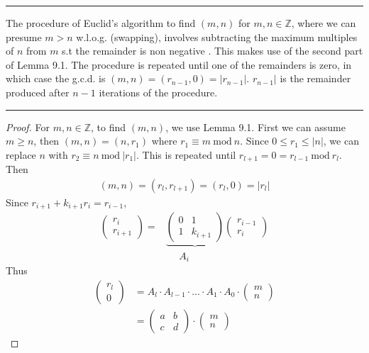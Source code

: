 \documentclass{article}
\theoremstyle{definition}
\theoremstyle{remark}
\begin{document}
\hrule
\vspace{2mm}
The procedure of Euclid's algorithm to find $(m,n)$ for $m,n\in\mathbb{Z}$, where we can presume $m>n$ w.l.o.g. (swapping), involves subtracting the maximum multiples of $n$ from $m$ s.t the remainder is non negative . This makes use of the second part of Lemma 9.1. The procedure is repeated until one of the remainders is zero, in which case the g.c.d. is $(m,n)=(r_{n-1},0)=|r_{n-1}|$. $r_{n-1}|$ is the remainder produced after $n-1$ iterations of the procedure.\\
\hrule
\begin{proof}
	For $m,n\in\mathbb{Z}$, to find $(m,n)$, we use Lemma 9.1. First we can assume $m\geq n$, then $(m,n)=(n,r_1)$ where $r_1\equiv m~\mathrm{mod}~n$. Since $0\leq r_1\leq |n|$, we can replace $n$ with $r_2\equiv n~\mathrm{mod}~|r_1|$. This is repeated until $r_{l+1}=0=r_{l-1}~\mathrm{mod}~r_l$. Then
	\begin{align*}
		(m,n)=(r_l,r_{l+1})=(r_l,0)=|r_l|
	\end{align*}
	Since $r_{i+1}+k_{i+1}r_i=r_{i-1}$,
	\begin{align*}
		\begin{pmatrix}
			r_i \\
			r_{i+1}
		\end{pmatrix}
		=
		 & \underbrace{\begin{pmatrix}
				               0 & 1       \\
				               1 & k_{i+1}
			               \end{pmatrix}}
		\begin{pmatrix}
			r_{i-1} \\
			r_i
		\end{pmatrix}                \\
		 & ~~~~~~A_i
	\end{align*}
	Thus
	\begin{align*}
		\begin{pmatrix}
			r_l \\0
		\end{pmatrix}
		 & =A_l\cdot A_{l-1}\cdot...\cdot A_1\cdot A_0\cdot\begin{pmatrix}
			                                                   m \\n
		                                                   \end{pmatrix} \\
		 & =\begin{pmatrix}
			    a & b \\
			    c & d
		    \end{pmatrix}
		\cdot \begin{pmatrix}
			      m \\n
		      \end{pmatrix}
	\end{align*}
\end{proof}
\newpage
\end{document}
